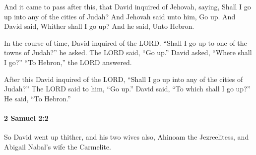 			\begin{versebox}
					\item[BHS] 
					\item[ASV] And it came to pass after this, that David inquired of Jehovah, saying, Shall I go up into any of the cities of Judah? And Jehovah said unto him, Go up. And David said, Whither shall I go up? And he said, Unto Hebron.
					\item[NIV] In the course of time, David inquired of the LORD. “Shall I go up to one of the towns of Judah?” he asked. The LORD said, “Go up.” David asked, “Where shall I go?” “To Hebron,” the LORD answered.
					\item[NRSV] After this David inquired of the LORD, “Shall I go up into any of the cities of Judah?” The LORD said to him, “Go up.” David said, “To which shall I go up?” He said, “To Hebron.”
			\end{versebox}

		\paragraph{2 Samuel 2:2} %
			\label{2SAMUEL-2-2}

			So David went up thither, and his two wives also, Ahinoam the Jezreelitess, and Abigail Nabal’s wife the Carmelite.

